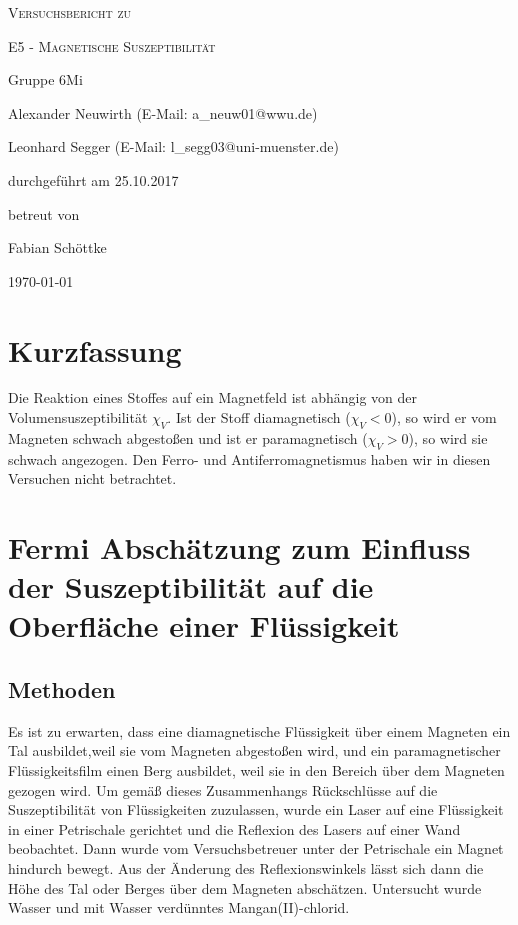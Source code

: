 \documentclass[
	a4paper,
	12pt,
	pagesize,
	ngerman
]{scrartcl}
\begin{document}
	
	\begin{titlepage}
		\centering
		{\scshape\LARGE Versuchsbericht zu \par}
		\vspace{1cm}
		{\scshape\huge E5 - Magnetische Suszeptibilität\par}
		\vspace{2.5cm}
		{\LARGE Gruppe 6Mi \par}
		\vspace{0.5cm}
		
		{\large Alexander Neuwirth (E-Mail: a\_neuw01@wwu.de) \par}
		{\large Leonhard Segger (E-Mail: l\_segg03@uni-muenster.de) \par}
		\vfill
		
		durchgeführt am 25.10.2017\par
		betreut von\par
		{\large Fabian Schöttke}
		
		\vfill
		
		{\large \today\par}
	\end{titlepage}
	\tableofcontents
	\newpage
	
	\section{Kurzfassung}
	Die Reaktion eines Stoffes auf ein Magnetfeld ist abhängig von der Volumensuszeptibilität $\chi_V$. Ist der Stoff diamagnetisch ($\chi_V<0$), so wird er vom Magneten schwach abgestoßen und ist er paramagnetisch ($\chi_V>0$), so wird sie schwach angezogen. Den Ferro- und Antiferromagnetismus haben wir in diesen Versuchen nicht betrachtet.
	
	\section{Fermi Abschätzung zum Einfluss der Suszeptibilität auf die Oberfläche einer Flüssigkeit}
	\subsection{Methoden}
	Es ist zu erwarten, dass eine diamagnetische Flüssigkeit über einem Magneten ein Tal ausbildet,weil sie vom Magneten abgestoßen wird, und ein paramagnetischer Flüssigkeitsfilm einen Berg ausbildet, weil sie in den Bereich über dem Magneten gezogen wird. 
	Um gemäß dieses Zusammenhangs Rückschlüsse auf die Suszeptibilität von Flüssigkeiten zuzulassen, wurde ein Laser auf eine Flüssigkeit in einer Petrischale gerichtet und die Reflexion des Lasers auf einer Wand beobachtet. Dann wurde vom Versuchsbetreuer unter der Petrischale ein Magnet hindurch bewegt. Aus der Änderung des Reflexionswinkels lässt sich dann die Höhe des Tal oder Berges über dem Magneten abschätzen. Untersucht wurde Wasser und mit Wasser verdünntes Mangan(II)-chlorid.
\end{document}
